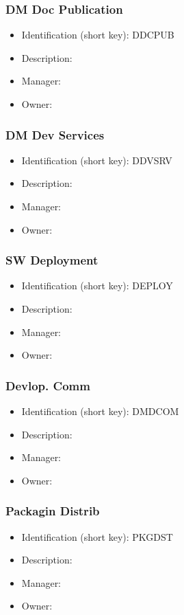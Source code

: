 \subsubsection{DM Doc Publication}\label{sect:DDCPUB}
\begin{itemize}
\item Identification (short key): DDCPUB
\item Description: 
\item Manager: 
\item Owner: 
\end{itemize}

\subsubsection{DM Dev Services}\label{sect:DDVSRV}
\begin{itemize}
\item Identification (short key): DDVSRV
\item Description: 
\item Manager: 
\item Owner: 
\end{itemize}

\subsubsection{SW Deployment}\label{sect:DEPLOY}
\begin{itemize}
\item Identification (short key): DEPLOY
\item Description: 
\item Manager: 
\item Owner: 
\end{itemize}

\subsubsection{Devlop. Comm}\label{sect:DMDCOM}
\begin{itemize}
\item Identification (short key): DMDCOM
\item Description: 
\item Manager: 
\item Owner: 
\end{itemize}

\subsubsection{Packagin Distrib}\label{sect:PKGDST}
\begin{itemize}
\item Identification (short key): PKGDST
\item Description: 
\item Manager: 
\item Owner: 
\end{itemize}

